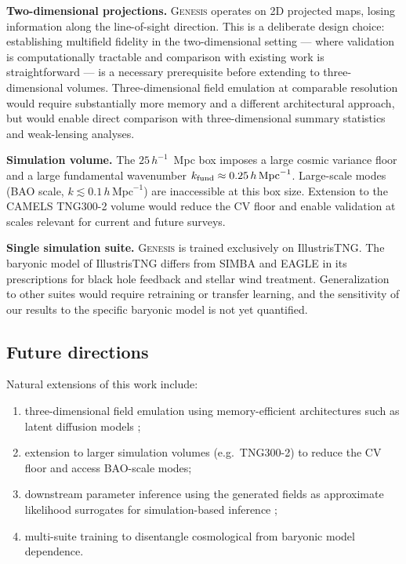 \documentclass[usenatbib]{mnras}
\begin{document}
\textbf{Two-dimensional projections.}
\textsc{Genesis} operates on 2D projected maps, losing information
along the line-of-sight direction.
This is a deliberate design choice: establishing multifield fidelity in
the two-dimensional setting --- where validation is computationally
tractable and comparison with existing work is straightforward --- is a
necessary prerequisite before extending to three-dimensional volumes.
Three-dimensional field emulation at comparable resolution would require
substantially more memory and a different architectural approach, but
would enable direct comparison with three-dimensional summary statistics
and weak-lensing analyses.

\textbf{Simulation volume.}
The $25\,h^{-1}$~Mpc box imposes a large cosmic variance floor and a
large fundamental wavenumber
$k_{\rm fund} \approx 0.25\,h\,\mathrm{Mpc}^{-1}$.
Large-scale modes (BAO scale,
$k \lesssim 0.1\,h\,\mathrm{Mpc}^{-1}$) are inaccessible at this box
size.
Extension to the CAMELS TNG300-2 volume would reduce the CV floor and
enable validation at scales relevant for current and future surveys.

\textbf{Single simulation suite.}
\textsc{Genesis} is trained exclusively on IllustrisTNG.
The baryonic model of IllustrisTNG differs from SIMBA and EAGLE in its
prescriptions for black hole feedback and stellar wind treatment.
Generalization to other suites would require retraining or transfer
learning, and the sensitivity of our results to the specific baryonic
model is not yet quantified.

\subsection{Future directions}
\label{sec:disc_future}

Natural extensions of this work include:
\begin{enumerate}[label=\arabic*., leftmargin=*, labelsep=0.5em]
  \item three-dimensional field emulation using memory-efficient
        architectures such as latent diffusion models
        \citep{Rombach2022};
  \item extension to larger simulation volumes (e.g.\ TNG300-2) to
        reduce the CV floor and access BAO-scale modes;
  \item downstream parameter inference using the generated fields as
        approximate likelihood surrogates for simulation-based
        inference \citep[SBI;][]{Cranmer2020};
  \item multi-suite training to disentangle cosmological from baryonic
        model dependence.
\end{enumerate}
\end{document}

